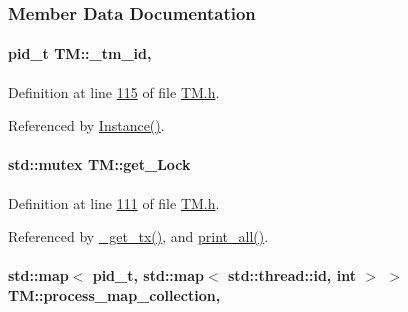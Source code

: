 \subsubsection{Member Data Documentation}
\paragraph[{\texorpdfstring{\+\_\+tm\+\_\+id}{_tm_id}}]{\setlength{\rightskip}{0pt plus 5cm}pid\+\_\+t T\+M\+::\+\_\+tm\+\_\+id\hspace{0.3cm}{\ttfamily [static]}, {\ttfamily [private]}}\hypertarget{class_t_m_a9d49d0ddef82337e54b684c9e1e8ad21_a9d49d0ddef82337e54b684c9e1e8ad21}{}\label{class_t_m_a9d49d0ddef82337e54b684c9e1e8ad21_a9d49d0ddef82337e54b684c9e1e8ad21}


Definition at line \hyperlink{_t_m_8h_source_l00115}{115} of file \hyperlink{_t_m_8h_source}{T\+M.\+h}.



Referenced by \hyperlink{_t_m_8cpp_source_l00031}{Instance()}.

\paragraph[{\texorpdfstring{get\+\_\+\+Lock}{get_Lock}}]{\setlength{\rightskip}{0pt plus 5cm}std\+::mutex T\+M\+::get\+\_\+\+Lock\hspace{0.3cm}{\ttfamily [private]}}\hypertarget{class_t_m_a123bc5aa0766a7b909bebc54a429e5b0_a123bc5aa0766a7b909bebc54a429e5b0}{}\label{class_t_m_a123bc5aa0766a7b909bebc54a429e5b0_a123bc5aa0766a7b909bebc54a429e5b0}


Definition at line \hyperlink{_t_m_8h_source_l00111}{111} of file \hyperlink{_t_m_8h_source}{T\+M.\+h}.



Referenced by \hyperlink{_t_m_8cpp_source_l00081}{\+\_\+get\+\_\+tx()}, and \hyperlink{_t_m_8cpp_source_l00132}{print\+\_\+all()}.

\paragraph[{\texorpdfstring{process\+\_\+map\+\_\+collection}{process_map_collection}}]{\setlength{\rightskip}{0pt plus 5cm}std\+::map$<$ pid\+\_\+t, std\+::map$<$ std\+::thread\+::id, int $>$ $>$ T\+M\+::process\+\_\+map\+\_\+collection\hspace{0.3cm}{\ttfamily [static]}, {\ttfamily [private]}}\hypertarget{class_t_m_a6d417b18213968da2a70a914e80d639b_a6d417b18213968da2a70a914e80d639b}{}\label{class_t_m_a6d417b18213968da2a70a914e80d639b_a6d417b18213968da2a70a914e80d639b}


